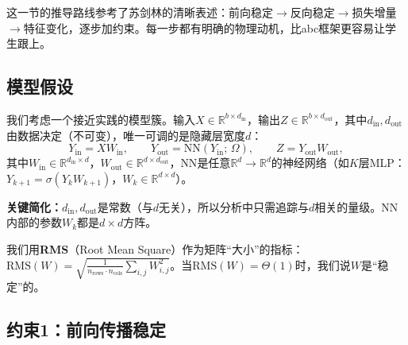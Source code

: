 \documentclass[11pt,a4paper]{article}
\newcommand{\R}{\mathbb{R}}
\begin{document}
\begin{teachingtip}
这一节的推导路线参考了苏剑林的清晰表述：前向稳定$\to$反向稳定$\to$损失增量$\to$特征变化，逐步加约束。每一步都有明确的物理动机，比abc框架更容易让学生跟上。
\end{teachingtip}

\subsection{模型假设}

我们考虑一个接近实践的模型簇。输入$X\in\R^{b\times d_{\text{in}}}$，输出$Z\in\R^{b\times d_{\text{out}}}$，其中$d_{\text{in}}, d_{\text{out}}$由数据决定（不可变），唯一可调的是隐藏层宽度$d$：
\begin{equation}
Y_{\text{in}} = XW_{\text{in}}, \qquad Y_{\text{out}} = \text{NN}(Y_{\text{in}};\,\Omega), \qquad Z = Y_{\text{out}}W_{\text{out}},
\end{equation}
其中$W_{\text{in}}\in\R^{d_{\text{in}}\times d}$，$W_{\text{out}}\in\R^{d\times d_{\text{out}}}$，$\text{NN}$是任意$\R^d\to\R^d$的神经网络（如$K$层MLP：$Y_{k+1}=\sigma(Y_k W_{k+1})$，$W_k\in\R^{d\times d}$）。

\textbf{关键简化：}$d_{\text{in}}, d_{\text{out}}$是常数（与$d$无关），所以分析中只需追踪与$d$相关的量级。$\text{NN}$内部的参数$W_k$都是$d\times d$方阵。

我们用\textbf{RMS}（Root Mean Square）作为矩阵``大小''的指标：$\text{RMS}(W) = \sqrt{\frac{1}{n_{\text{rows}}\cdot n_{\text{cols}}}\sum_{i,j}W_{i,j}^2}$。当$\text{RMS}(W) = \Theta(1)$时，我们说$W$是``稳定''的。

\subsection{约束1：前向传播稳定}
\end{document}
